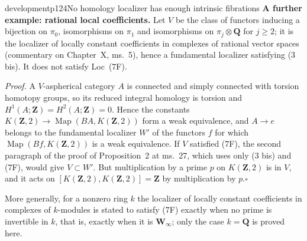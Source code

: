 \begin{dcomment}{development}{p124}{No homology localizer has enough intrinsic fibrations}
\textbf{A further example: rational local coefficients.}\ours
Let $V$ be the class of functors inducing a bijection on $\pi_0$, isomorphisms on $\pi_1$ and isomorphisms on $\pi_j\otimes\mathbf Q$ for $j\geq2$; it is the localizer of locally constant coefficients in complexes of rational vector spaces (commentary on Chapter~X, ms.~5), hence a fundamental localizer satisfying (3 bis). It does not satisfy Loc~(7F).

\textit{Proof.} A $V$-aspherical category $A$ is connected and simply connected with torsion homotopy groups, so its reduced integral homology is torsion and $H^1(A;\mathbf Z)=H^2(A;\mathbf Z)=0$. Hence the constants $K(\mathbf Z,2)\to\operatorname{Map}(BA,K(\mathbf Z,2))$ form a weak equivalence, and $A\to e$ belongs to the fundamental localizer $W'$ of the functors $f$ for which $\operatorname{Map}(Bf,K(\mathbf Z,2))$ is a weak equivalence. If $V$ satisfied (7F), the second paragraph of the proof of Proposition~2 at ms.~27, which uses only (3 bis) and (7F), would give $V\subset W'$. But multiplication by a prime $p$ on $K(\mathbf Z,2)$ is in $V$, and it acts on $[K(\mathbf Z,2),K(\mathbf Z,2)]=\mathbf Z$ by multiplication by $p$.\hfill$\square$

More generally, for a nonzero ring $k$ the localizer of locally constant coefficients in complexes of $k$-modules is stated to satisfy (7F) exactly when no prime is invertible in $k$, that is, exactly when it is $\mathbf W_\infty$; only the case $k=\mathbf Q$ is proved here.
\end{dcomment}
